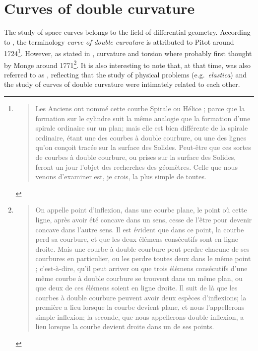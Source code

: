 
\section{Curves of double curvature}

The study of space curves belongs to the field of differential geometry. According to \cite[p.28]{Delcourt2007}, the terminology \emph{curve of double curvature} is attributed to Pitot around 1724\footnote{
\blockcquote[p.28]{Pitot1726}{
Les Anciens ont nommé cette courbe Spirale ou Hélice ; parce que la formation sur le cylindre suit la même analogie que la formation d’une spirale ordinaire sur un plan; mais elle est bien différente de la spirale ordinaire, étant une des courbes à double courbure, ou une des lignes qu’on conçoit tracée sur la surface des Solides. Peut-être que ces sortes de courbes à double courbure, ou prises sur la surface des Solides, feront un jour l’objet des recherches des géomètres. Celle que nous venons d’examiner est, je crois, la plus simple de toutes.
}}.
However, as stated in \cite[p.321]{Coolidge2013}, curvature and torsion where probably first thought by Monge around 1771\footnote{
\blockcquote[p.363]{Monge1809}{On appelle point d'inflexion, dans une courbe plane, le point où cette ligne, après avoir été concave dans un sens, cesse de l'être pour devenir concave dans l'autre sens. Il est évident que dans ce point, la courbe perd sa courbure, et que les deux élémens consécutifs sont en ligne droite. Mais une courbe à double courbure peut perdre chacune de ses courbures en particulier, ou les perdre toutes deux dans le même point ; c'est-à-dire, qu'il peut arriver ou que trois élémens consécutifs d'une même courbe à double courbure se trouvent dans un même plan, ou que deux de ces élémens soient en ligne droite. Il suit de là que les courbes à double courbure peuvent avoir deux espèces d'inflexions; la première a lieu lorsque la courbe devient plane, et nous l'appellerons simple inflexion; la seconde, que nous appellerons double inflexion, a lieu lorsque la courbe devient droite dans un de ses points.
}.}. It is also interesting to note that, at that time,  was also referred to as , reflecting that the study of physical problems (e.g.\ \emph{elastica}) and the study of curves of double curvature were intimately related to each other.

